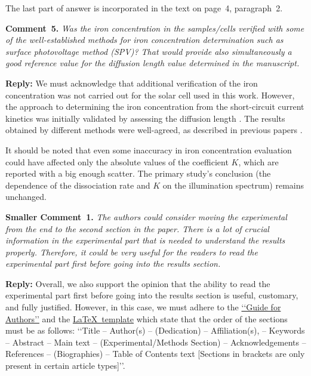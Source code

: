 \documentclass{WileyMSP-template}
\begin{document}
The last part of answer is incorporated in the text on page~4, paragraph~2.




\vspace{1cm}
\noindent
\textcolor[rgb]{0.00,0.50,1.00}{\textbf{Comment~5.}}
\emph{
Was the iron concentration in the samples/cells verified with some of the well-established methods
for iron concentration determination such as surface photovoltage method (SPV)?
That would provide also simultaneously a good reference value for the diffusion length value determined in the manuscript.
}

\noindent
\textcolor[rgb]{0.51,0.00,0.00}{\textbf{Reply:}}
We must acknowledge that additional verification of the iron concentration was not carried out for the solar cell used in this work.
However, the approach to determining the iron concentration from the short-circuit current kinetics
was initially validated by assessing the diffusion length \cite{FeB_Zong}.
The results obtained by different methods were well-agreed, as described in previous papers \cite{Olikh2021JAP,Olikh2022:JMatSci}.

It should be noted that even some inaccuracy in iron concentration evaluation could have affected only
the absolute values of the coefficient $K$, which are reported \cite{FeBLight2,FeBAssJAP2014,FeBKin2019} with a big enough scatter.
The primary study's conclusion (the dependence of the dissociation rate and $K$ on the illumination spectrum) remains unchanged.




\vspace{1cm}
\noindent
\textcolor[rgb]{0.00,0.50,1.00}{\textbf{Smaller Comment~1.}}
\emph{The authors could consider moving the experimental from the end to the second section in the paper.
There is a lot of crucial information in the experimental part that is needed to understand the results properly.
Therefore, it could be very useful for the readers to read the experimental part first before going into the results section.}

\noindent
\textcolor[rgb]{0.51,0.00,0.00}{\textbf{Reply:}}
Overall, we also support the opinion that the ability to read the experimental part first
before going into the results section is useful, customary, and fully justified.
However, in this case, we must adhere to the
\href{https://onlinelibrary.wiley.com/page/journal/18626319/homepage/author-guidelines}{‘‘Guide for Authors’’}
and the
\href{https://onlinelibrary.wiley.com/pb-assets/assets/vch/msp/LaTeX-template-1593698612150.zip}{\LaTeX~template}
which state that the order of the sections must be as follows:
‘‘Title -- Author(s) -- (Dedication) -- Affiliation(s), -- Keywords --
Abstract -- Main text -- (Experimental/Methods Section) -- Acknowledgements -- References -- (Biographies) -- Table of Contents text
 [Sections in brackets are only present in certain article types]’’.
\end{document}
